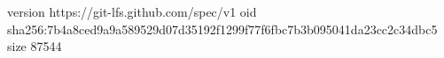 version https://git-lfs.github.com/spec/v1
oid sha256:7b4a8ced9a9a589529d07d35192f1299f77f6fbc7b3b095041da23cc2c34dbc5
size 87544
